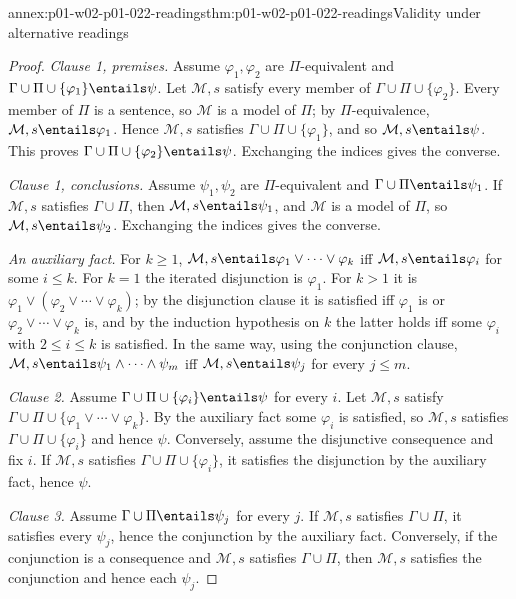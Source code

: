 \begin{annexitem}{annex:p01-w02-p01-022-readings}{thm:p01-w02-p01-022-readings}{Validity under alternative readings}
\begin{proof}
\emph{Clause 1, premises.} Assume \(\varphi_1,\varphi_2\) are
\(\Pi\)-equivalent and \(\Gamma\cup\Pi\cup\{\varphi_1\}\entails\psi\). Let
\(\mathcal M,s\) satisfy every member of \(\Gamma\cup\Pi\cup\{\varphi_2\}\).
Every member of \(\Pi\) is a sentence, so \(\mathcal M\) is a model of
\(\Pi\); by \(\Pi\)-equivalence, \(\mathcal M,s\entails\varphi_1\). Hence
\(\mathcal M,s\) satisfies \(\Gamma\cup\Pi\cup\{\varphi_1\}\), and so
\(\mathcal M,s\entails\psi\). This proves
\(\Gamma\cup\Pi\cup\{\varphi_2\}\entails\psi\). Exchanging the indices gives
the converse.

\emph{Clause 1, conclusions.} Assume \(\psi_1,\psi_2\) are
\(\Pi\)-equivalent and \(\Gamma\cup\Pi\entails\psi_1\). If \(\mathcal M,s\)
satisfies \(\Gamma\cup\Pi\), then \(\mathcal M,s\entails\psi_1\), and
\(\mathcal M\) is a model of \(\Pi\), so \(\mathcal M,s\entails\psi_2\).
Exchanging the indices gives the converse.

\emph{An auxiliary fact.} For \(k\geq1\),
\(\mathcal M,s\entails\varphi_1\lor\cdots\lor\varphi_k\) iff
\(\mathcal M,s\entails\varphi_i\) for some \(i\leq k\). For \(k=1\) the
iterated disjunction is \(\varphi_1\). For \(k>1\) it is
\(\varphi_1\lor(\varphi_2\lor\cdots\lor\varphi_k)\); by the disjunction
clause it is satisfied iff \(\varphi_1\) is or
\(\varphi_2\lor\cdots\lor\varphi_k\) is, and by the induction hypothesis on
\(k\) the latter holds iff some \(\varphi_i\) with \(2\leq i\leq k\) is
satisfied. In the same way, using the conjunction clause,
\(\mathcal M,s\entails\psi_1\land\cdots\land\psi_m\) iff
\(\mathcal M,s\entails\psi_j\) for every \(j\leq m\).

\emph{Clause 2.} Assume \(\Gamma\cup\Pi\cup\{\varphi_i\}\entails\psi\) for
every \(i\). Let \(\mathcal M,s\) satisfy
\(\Gamma\cup\Pi\cup\{\varphi_1\lor\cdots\lor\varphi_k\}\). By the auxiliary
fact some \(\varphi_i\) is satisfied, so \(\mathcal M,s\) satisfies
\(\Gamma\cup\Pi\cup\{\varphi_i\}\) and hence \(\psi\). Conversely, assume the
disjunctive consequence and fix \(i\). If \(\mathcal M,s\) satisfies
\(\Gamma\cup\Pi\cup\{\varphi_i\}\), it satisfies the disjunction by the
auxiliary fact, hence \(\psi\).

\emph{Clause 3.} Assume \(\Gamma\cup\Pi\entails\psi_j\) for every \(j\). If
\(\mathcal M,s\) satisfies \(\Gamma\cup\Pi\), it satisfies every \(\psi_j\),
hence the conjunction by the auxiliary fact. Conversely, if the conjunction
is a consequence and \(\mathcal M,s\) satisfies \(\Gamma\cup\Pi\), then
\(\mathcal M,s\) satisfies the conjunction and hence each \(\psi_j\).
\end{proof}
\end{annexitem}

